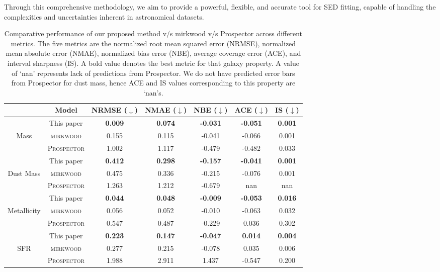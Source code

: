 \documentclass[letterpaper]{article}
\begin{document}
Through this comprehensive methodology, we aim to provide a powerful, flexible, and accurate tool for SED fitting, capable of handling the complexities and uncertainties inherent in astronomical datasets.
\begin{table*}
\centering
\begin{tabular}{ccccccc}
\toprule
\toprule
& Model &  NRMSE ($\downarrow$) & NMAE ($\downarrow$) & NBE ($\downarrow$) & ACE ($\downarrow$) & IS ($\downarrow$) \\ \midrule
& This paper  &  \textbf{0.009}&  \textbf{0.074}&  \textbf{-0.031}&  \textbf{-0.051}&  \textbf{0.001}\\
Mass & \textsc{mirkwood} &    0.155&  0.115&  -0.041&  -0.066&  0.001 \\
& \textsc{Prospector} &  1.002&  1.117&  -0.479&   -0.482&  0.033\\ \midrule
& This paper  &    \textbf{0.412}&   \textbf{0.298}&  \textbf{-0.157}&   \textbf{-0.041}&  \textbf{0.001}\\
Dust Mass & \textsc{mirkwood} &  0.475&  0.336&  -0.215&  -0.076& 0.001 \\
& \textsc{Prospector} &  1.263&  1.212& -0.679&  nan&  nan \\ \midrule
& This paper&  \textbf{0.044}&   \textbf{0.048}&  \textbf{-0.009}&  \textbf{-0.053}&  \textbf{0.016}\\
Metallicity & \textsc{mirkwood} &  0.056&  0.052&   -0.010&  -0.063&  0.032\\
& \textsc{Prospector}&  0.547&  0.487&   -0.229&  0.036&  0.302\\ \midrule
& This paper&  \textbf{0.223}&   \textbf{0.147}&  \textbf{-0.047}&  \textbf{0.014}&  \textbf{0.004}\\
SFR & \textsc{mirkwood}&   0.277&  0.215&   -0.078&  0.035&  0.006\\
& \textsc{Prospector}&  1.988&  2.911&   1.437&  -0.547&    0.200\\ \bottomrule
\end{tabular}
\caption{Comparative performance of our proposed method v/s {\sc mirkwood} v/s {\sc Prospector} across different metrics. The five metrics are the normalized root mean squared error (NRMSE), normalized mean absolute error (NMAE), normalized bias error (NBE), average coverage error (ACE), and interval sharpness (IS). A bold value denotes the best metric for that galaxy property. A value of `nan' represents lack of predictions from {\sc Prospector}. We do not have predicted error bars from {\sc Prospector} for dust mass, hence ACE and IS values corresponding to this property are `nan's.}
\label{tab:results_snr20}
\end{table*}
\end{document}
